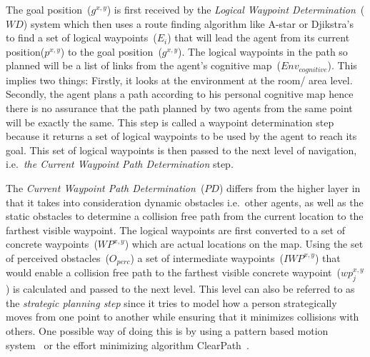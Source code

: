 The goal position~($g^{x,y}$) is first received by the \emph{Logical Waypoint Determination}~($WD$) system which then uses a route finding algorithm like A-star or Djikstra's~\cite{Russel:1995wca} to find a set of logical waypoints~($E_i$) that will lead the agent from its current position($p^{x,y}$) to the goal position~($g^{x,y}$). The logical waypoints in the path so planned will be a list of links from the agent's cognitive map~($Env_{cognitive}$). This implies two things: Firstly, it looks at the environment at the room/ area level. Secondly, the agent plans a path according to his personal cognitive map hence there is no assurance that the path planned by two agents from the same point will be exactly the same. This step is called a waypoint determination step because it returns a set of logical waypoints to be used by the agent to reach its goal. This set of logical waypoints is then passed to the next level of navigation, i.e.\ \emph{the Current Waypoint Path Determination} step.

The \emph{Current Waypoint Path Determination}~($PD$) differs from the higher layer in that it takes into consideration dynamic obstacles i.e.\ other agents, as well as the static obstacles to determine a collision free path from the current location to the farthest visible waypoint. The logical waypoints are first converted to a set of concrete waypoints~($WP^{x,y}$) which are actual locations on the map. Using the set of perceived obstacles~($O_{perc}$) a set of intermediate waypoints~($IWP^{x,y}$) that would enable a collision free path to the farthest visible concrete waypoint~($wp^{x,y}_j$) is calculated and passed to the next level. This level can also be referred to as the \emph{strategic planning step} since it tries to model how a person strategically moves from one point to another while ensuring that it minimizes collisions with others. One possible way of doing this is by using a pattern based motion system~\cite{Nan:2011vr} or the effort minimizing algorithm ClearPath~\cite{Guy:2009gu}. 

